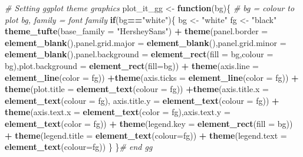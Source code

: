 \documentclass[10,portrait]{article}
\newenvironment{Shaded}{\begin{snugshade}}{\end{snugshade}}
\newcommand{\KeywordTok}[1]{\textcolor[rgb]{0.13,0.29,0.53}{\textbf{#1}}}
\newcommand{\DataTypeTok}[1]{\textcolor[rgb]{0.13,0.29,0.53}{#1}}
\newcommand{\StringTok}[1]{\textcolor[rgb]{0.31,0.60,0.02}{#1}}
\newcommand{\CommentTok}[1]{\textcolor[rgb]{0.56,0.35,0.01}{\textit{#1}}}
\newcommand{\ControlFlowTok}[1]{\textcolor[rgb]{0.13,0.29,0.53}{\textbf{#1}}}
\newcommand{\OperatorTok}[1]{\textcolor[rgb]{0.81,0.36,0.00}{\textbf{#1}}}
\newcommand{\NormalTok}[1]{#1}
\begin{document}
\begin{Shaded}
\begin{Highlighting}[]
\CommentTok{# Setting ggplot theme graphics}
\NormalTok{plot_it_gg <-}\StringTok{ }\ControlFlowTok{function}\NormalTok{(bg)\{ }\CommentTok{# bg = colour to plot bg, family = font family}
  \ControlFlowTok{if}\NormalTok{(bg}\OperatorTok{==}\StringTok{"white"}\NormalTok{)\{}
\NormalTok{    bg <-}\StringTok{ "white"}
\NormalTok{    fg <-}\StringTok{ "black"}
  \KeywordTok{theme_tufte}\NormalTok{(}\DataTypeTok{base_family =} \StringTok{"HersheySans"}\NormalTok{) }\OperatorTok{+}
\StringTok{    }\KeywordTok{theme}\NormalTok{(}\DataTypeTok{panel.border =} \KeywordTok{element_blank}\NormalTok{(),}\DataTypeTok{panel.grid.major =} \KeywordTok{element_blank}\NormalTok{(),}\DataTypeTok{panel.grid.minor =} \KeywordTok{element_blank}\NormalTok{(),}\DataTypeTok{panel.background =} \KeywordTok{element_rect}\NormalTok{(}\DataTypeTok{fill =}\NormalTok{ bg,}\DataTypeTok{colour =}\NormalTok{ bg),}\DataTypeTok{plot.background =} \KeywordTok{element_rect}\NormalTok{(}\DataTypeTok{fill=}\NormalTok{bg)) }\OperatorTok{+}
\StringTok{    }\KeywordTok{theme}\NormalTok{(}\DataTypeTok{axis.line =} \KeywordTok{element_line}\NormalTok{(}\DataTypeTok{color =}\NormalTok{ fg)) }\OperatorTok{+}\KeywordTok{theme}\NormalTok{(}\DataTypeTok{axis.ticks =} \KeywordTok{element_line}\NormalTok{(}\DataTypeTok{color =}\NormalTok{ fg)) }\OperatorTok{+}\StringTok{ }\KeywordTok{theme}\NormalTok{(}\DataTypeTok{plot.title =} \KeywordTok{element_text}\NormalTok{(}\DataTypeTok{colour =}\NormalTok{ fg)) }\OperatorTok{+}\KeywordTok{theme}\NormalTok{(}\DataTypeTok{axis.title.x =} \KeywordTok{element_text}\NormalTok{(}\DataTypeTok{colour =}\NormalTok{ fg), }\DataTypeTok{axis.title.y =} \KeywordTok{element_text}\NormalTok{(}\DataTypeTok{colour =}\NormalTok{ fg)) }\OperatorTok{+}\StringTok{ }\KeywordTok{theme}\NormalTok{(}\DataTypeTok{axis.text.x =} \KeywordTok{element_text}\NormalTok{(}\DataTypeTok{color =}\NormalTok{ fg),}\DataTypeTok{axis.text.y =} \KeywordTok{element_text}\NormalTok{(}\DataTypeTok{color =}\NormalTok{ fg)) }\OperatorTok{+}\StringTok{ }\KeywordTok{theme}\NormalTok{(}\DataTypeTok{legend.key =} \KeywordTok{element_rect}\NormalTok{(}\DataTypeTok{fill =}\NormalTok{ bg)) }\OperatorTok{+}\StringTok{ }\KeywordTok{theme}\NormalTok{(}\DataTypeTok{legend.title =} \KeywordTok{element_text}\NormalTok{(}\DataTypeTok{colour=}\NormalTok{fg)) }\OperatorTok{+}\StringTok{ }\KeywordTok{theme}\NormalTok{(}\DataTypeTok{legend.text =} \KeywordTok{element_text}\NormalTok{(}\DataTypeTok{colour=}\NormalTok{fg))}
\NormalTok{\}}
\NormalTok{  \}}\CommentTok{# end gg}
\end{Highlighting}
\end{Shaded}
\end{document}
